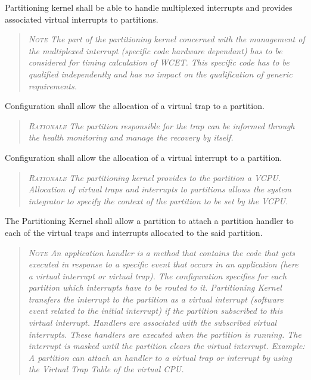 Partitioning kernel shall be able to handle multiplexed interrupts and provides associated virtual interrupts to partitions.
\begin{quote}\it
\textsc{Note}
The part of the partitioning kernel concerned with the management of the multiplexed interrupt (specific code hardware dependant) has to be considered for timing calculation of WCET. This specific code has to be qualified independently and has no impact on the qualification of generic requirements.
\end{quote}

Configuration shall allow the allocation of a virtual trap to a partition.
\begin{quote}\it
\textsc{Rationale}
The partition responsible for the trap can be informed through the health monitoring and manage the recovery by itself.
\end{quote}

Configuration shall allow the allocation of a virtual interrupt to a partition.
\begin{quote}\it
\textsc{Rationale}
The partitioning kernel provides to the partition a VCPU. Allocation of virtual traps and interrupts to partitions allows the system integrator to specify the context of the partition to be set by the VCPU.
\end{quote}

The Partitioning Kernel shall allow a partition to attach a partition handler to each of the virtual traps and interrupts allocated to the said partition.
\begin{quote}\it
\textsc{Note}
An application handler is a method that contains the code that gets executed in response to a specific event that occurs in an application (here a virtual interrupt or virtual trap).
The configuration specifies for each partition which interrupts have to be routed to it. Partitioning Kernel transfers the interrupt to the partition as a virtual interrupt (software event related to the initial interrupt) if the partition subscribed to this virtual interrupt.  Handlers are associated with the subscribed virtual interrupts. These handlers are executed when the partition is running.  The interrupt is masked until the partition clears the virtual interrupt.
Example: A partition can attach an handler to a virtual trap or interrupt by using the Virtual Trap Table of the virtual CPU.
\end{quote}

